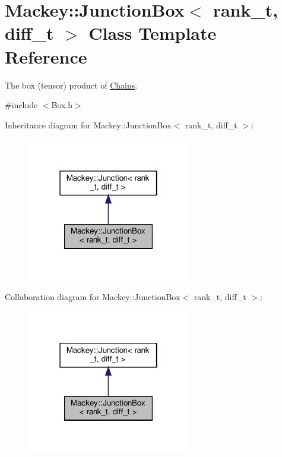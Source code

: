 \hypertarget{classMackey_1_1JunctionBox}{}\section{Mackey\+:\+:Junction\+Box$<$ rank\+\_\+t, diff\+\_\+t $>$ Class Template Reference}
\label{classMackey_1_1JunctionBox}


The box (tensor) product of \hyperlink{classMackey_1_1Chains}{Chains}.  




{\ttfamily \#include $<$Box.\+h$>$}



Inheritance diagram for Mackey\+:\+:Junction\+Box$<$ rank\+\_\+t, diff\+\_\+t $>$\+:\nopagebreak
\begin{figure}[H]
\begin{center}
\leavevmode
\includegraphics[width=202pt]{classMackey_1_1JunctionBox__inherit__graph}
\end{center}
\end{figure}


Collaboration diagram for Mackey\+:\+:Junction\+Box$<$ rank\+\_\+t, diff\+\_\+t $>$\+:\nopagebreak
\begin{figure}[H]
\begin{center}
\leavevmode
\includegraphics[width=202pt]{classMackey_1_1JunctionBox__coll__graph}
\end{center}
\end{figure}
